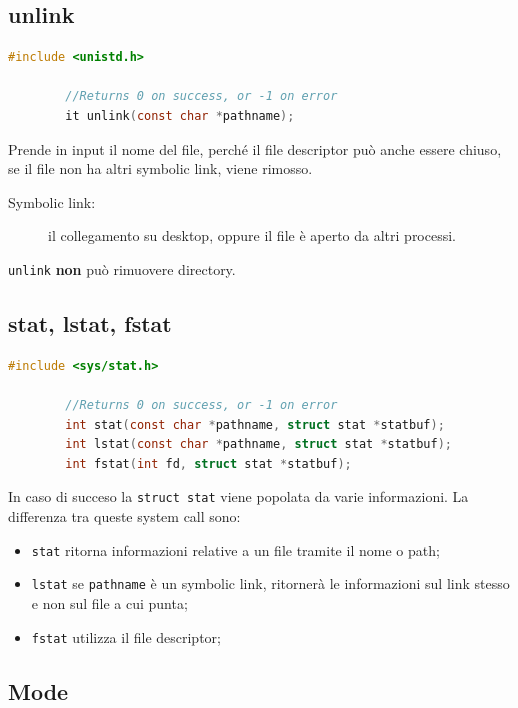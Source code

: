 \documentclass[a4paper, 12pt]{book}
\begin{document}
    \subsection{unlink}

    \begin{lstlisting}[language=C]
        #include <unistd.h>

        //Returns 0 on success, or -1 on error
        it unlink(const char *pathname);
    \end{lstlisting}
    Prende in input il nome del file, perché il file descriptor
    può anche essere chiuso, se il file non ha altri symbolic 
    link, viene rimosso.
    \begin{description}
        \item[Symbolic link:] il collegamento su desktop, oppure il file è aperto da altri processi. 
    \end{description}
    \verb|unlink| \textbf{non} può rimuovere directory.

    \subsection{stat, lstat, fstat}

    \begin{lstlisting}[language=C]
        #include <sys/stat.h>

        //Returns 0 on success, or -1 on error
        int stat(const char *pathname, struct stat *statbuf);
        int lstat(const char *pathname, struct stat *statbuf);
        int fstat(int fd, struct stat *statbuf);
    \end{lstlisting}
    In caso di succeso la \verb|struct stat| viene popolata da 
    varie informazioni. La differenza tra queste system call 
    sono: 
    \begin{itemize}
        \item \verb|stat| ritorna informazioni relative a un file tramite il nome o path;
        \item \verb|lstat| se \verb|pathname| è un symbolic link, ritornerà le informazioni sul link stesso e non sul file a cui punta;
        \item \verb|fstat| utilizza il file descriptor;
    \end{itemize}
    
    \subsection{Mode}
\end{document}
